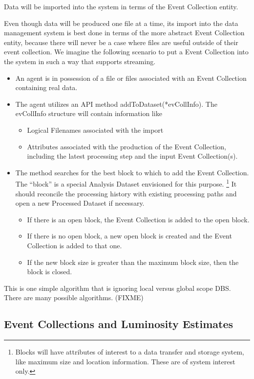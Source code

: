 \documentclass{cmspaper}
\begin{document}
Data will be imported into the system in terms of the 
Event Collection entity.  

Even though data will be produced one file at a time, its import  
into the data management system is best done in terms of the 
more abstract Event Collection entity, because there will 
never be a case where files are useful outside of their event collection. 
We imagine the following scenario to put  a Event Collection 
into the system in such a way that supports streaming.

\begin{itemize}
\item An agent is in possession of a file or files associated with an Event Collection
containing real data.
\item The agent utilizes an API method addToDataset(*evCollInfo).  The evCollInfo structure 
will contain information like 
\begin{itemize}
\item Logical Filenames associated with the import
\item Attributes associated with the production of the Event Collection, 
including the latest processing step and the input Event Collection(s). 
\end{itemize}
\item The method searches for the best block to which to add the Event Collection.  
The ``block'' is a special Analysis Dataset envisioned for this purpose.  
\footnote{Blocks will have attributes of interest to a data transfer and storage 
system, like maximum size and location information. These are of system interest only.}
It should reconcile the processing history with existing processing paths and 
open a new Processed Dataset if necessary.
\begin{itemize}
\item If there is an open block, the Event Collection is added to the open block.
\item If there is no open block, a new open block is created and the Event Collection is added to that one.
\item If the new block size is greater than the maximum block size, then the block is closed.  
\end{itemize}
\end{itemize}

This is one simple algorithm that is ignoring local versus global scope DBS.  
There are many possible algorithms.  (FIXME)


\subsection{ Event Collections and Luminosity Estimates}
\end{document}
